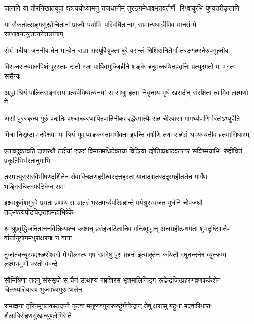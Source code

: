 \fourlineindentedshloka
{जलानि या तीरनिखातयूपा}
{वहत्ययोध्यामनु राजधानीम्}
{तुरङ्गमेधावभृतवतीर्णै-}
{रिक्ष्वाकुभिः पुण्यतरीकृतानि} %

\fourlineindentedshloka
{यां सैकतोत्सङ्गसुखोचितानां}
{प्राज्यैः पयोभिः परिवर्धितानाम्}
{सामान्यधात्रीमिव मानसं मे}
{सम्भावयत्युत्तरकोसलानाम्} %

\fourlineindentedshloka
{सेयं मदीया जननीव तेन}
{मान्येन राज्ञा सरयूर्वियुक्ता}
{दूरे वसन्तं शिशिरानिलैर्मां}
{तरङ्गहस्तैरुपगूहतीव} %

\fourlineindentedshloka
{विरक्तसन्ध्याकपिशं पुरस्ता-}
{द्यतो रजः पार्थिवमुज्जिहीते}
{शङ्के हनूमत्कथितप्रवृत्तिः}
{प्रत्युद्गतो मां भरतः ससैन्यः} %

\fourlineindentedshloka
{अद्धा श्रियं पालितसङ्गराय}
{प्रत्यर्पयिष्यत्यनघां स साधुः}
{हत्वा निवृत्ताय मृधे खरादीन्}
{संरक्षितां त्वामिव लक्ष्मणो मे} %

\fourlineindentedshloka
{असौ पुरस्कृत्य गुरुं पदातिः}
{पश्चादवस्थापितवाहिनीकः}
{वृद्धैरमात्यैः सह चीरवासा}
{मामर्घ्यपाणिर्भरतोऽभ्युपैति} %

\fourlineindentedshloka
{पित्रा निसृष्टां मदपेक्षया यः}
{श्रियं युवाप्यङ्कगतामभोक्ता}
{इयन्ति वर्षाणि तया सहोग्रं}
{अभ्यस्यतीव व्रतमासिधारम्} %

\fourlineindentedshloka
{एतावदुक्तवति दाशरथौ तदीयां}
{इच्छां विमानमधिदेवतया विदित्वा}
{द्योतिष्पथादवततार सविस्मयाभि-}
{रुद्वीक्षितं प्रकृतिभिर्भरतानुगाभिः} %

\fourlineindentedshloka
{तस्मात्पुरःसरविभीषणदर्शितेन}
{सेवाविचक्षणहरीश्वरदत्तहस्तः}
{यानादवातरददूरमहीतलेन}
{मार्गेण भङ्गिरचितस्फटिकेन रामः} %

\fourlineindentedshloka
{इक्ष्वाकुवंशगुरवे प्रयतः प्रणम्य}
{स भ्रातरं भरतमर्घ्यपरिग्रहान्ते}
{पर्यश्रुरस्वजत मूर्धनि चोपजघ्रौ}
{तद्भक्त्यपोढपितृराह्यमहाभिषेके} %

\fourlineindentedshloka
{श्मश्रुप्रवृद्धिजनिताननविक्रियांश्च}
{प्लक्षान् प्ररोहजटिलानिव मन्त्रिवृद्धान्}
{अन्वग्रहीत्प्रणमतः शुभदृष्टिपातै-}
{र्वार्त्तानुयोगमधुराक्षरया च वाचा} %

\fourlineindentedshloka
{दुर्जातबन्धुरयमृक्षहरीश्वरो मे}
{पौलस्त्य एष समरेषु पुरः प्रहर्ता}
{इत्यादृतेन कथितौ रघुनन्दनेन}
{व्युत्क्रम्य लक्ष्मणमुभौ भरतो ववन्दे} %

\fourlineindentedshloka
{सौमित्रिणा तदनु संससृजे स चैनं}
{उत्थाप्य नम्रशिरसं भृशमालिनिङ्ग}
{रूढेन्द्रजित्प्रहरणव्रणकर्कशेन}
{क्लिश्यन्निवास्य भुजमध्यमुरःस्थलेन} %

\fourlineindentedshloka
{रामाज्ञया हरिचमूपतयस्तदानीं}
{कृत्वा मनुष्यवपुरारुरुहुर्गजेन्द्रान्}
{तेषु क्षरत्सु बहुधा मदवारिधाराः}
{शैलाधिरोहणसुखान्युपलेभिरे ते} %

